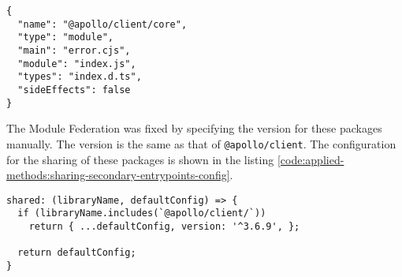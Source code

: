 \ifshowListings
\begin{listing}[H]
  \begin{verbatim}
{
  "name": "@apollo/client/core",
  "type": "module",
  "main": "error.cjs",
  "module": "index.js",
  "types": "index.d.ts",
  "sideEffects": false
}
    \end{verbatim}
    \caption{The \texttt{package.json} of \texttt{@apollo/client/core}}\label{code:applied-methods:package-json-apollo-client-core}
\end{listing}
\fi

\noindent The Module Federation was fixed by specifying the version for these packages manually. The version is the same as that of \texttt{@apollo/client}. The configuration for the sharing of these packages is shown in the listing \ref{code:applied-methods:sharing-secondary-entrypoints-config}. 

\ifshowListings
\begin{listing}[H]
  \begin{verbatim}
shared: (libraryName, defaultConfig) => {
  if (libraryName.includes(`@apollo/client/`))
    return { ...defaultConfig, version: '^3.6.9', };

  return defaultConfig;
}
    \end{verbatim}
    \caption{Specifying the version for the secondary entry points for the \texttt{@apollo/client} package.}\label{code:applied-methods:sharing-secondary-entrypoints-config}
\end{listing}
\fi


